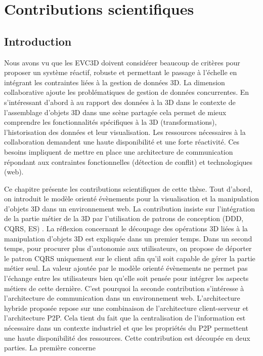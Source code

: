 \chapter{Contributions scientifiques}
\chaptertable
\section{Introduction}
Nous avons vu que les \gls{EVC3D} doivent considérer beaucoup de critères pour 
proposer un système réactif, robuste et permettant le passage à l'échelle en 
intégrant les contraintes liées à la gestion de données 3D. La dimension 
collaborative ajoute les problématiques de gestion de données concurrentes.
En s'intéressant d'abord à au rapport des données à la 3D dans le contexte de 
l'assemblage d'objets 3D dans une scène partagée cela permet de 
mieux comprendre les fonctionnalités spécifiques à la 3D (transformations), 
l'historisation des données et leur visualisation. Les ressources nécessaires à la 
collaboration demandent une haute disponibilité et une forte réactivité. Ces 
besoins impliquent de mettre en place une architecture de communication 
répondant aux contraintes fonctionnelles (détection de conflit) et technologiques 
(web).

Ce chapitre présente les contributions scientifiques de cette thèse.
Tout d'abord, on introduit le modèle orienté évènements pour la 
visualisation et la manipulation d'objets 3D dans un environnement web. La 
contribution insiste sur l'intégration de la partie métier de la 3D par l'utilisation de 
patrons de conception (\gls{DDD}, \gls{CQRS}, \gls{ES}) . La réflexion concernant 
le découpage des opérations 3D liées à la manipulation d'objets 3D est expliquée 
dans un premier temps. Dans un second temps, pour procurer plus d'autonomie 
aux utilisateurs, on propose de déporter le patron \gls{CQRS} uniquement sur le 
client afin qu'il soit capable de gérer la partie métier seul. La valeur ajoutée par le 
modèle orienté évènements ne permet pas l'échange entre les utilisateurs bien 
qu'elle soit pensée pour intégrer les aspects métiers de cette dernière. 
C'est pourquoi la seconde contribution s'intéresse à l'architecture de 
communication dans un environnement web. L'architecture hybride proposée 
repose sur une combinaison de l'architecture client-serveur et l'architecture P2P. 
Cela tient du fait que la centralisation de l'information est nécessaire dans un 
contexte industriel et que les propriétés du P2P permettent une haute disponibilité 
des ressources. Cette contribution est découpée en deux parties. La première 
concerne 

